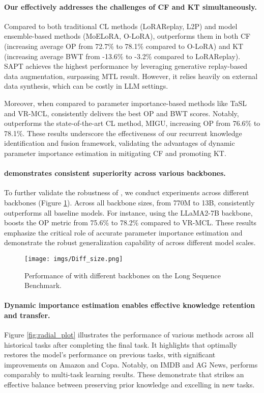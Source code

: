 \paragraph{Our {\ouralg} effectively addresses the challenges of CF and KT simultaneously.}
Compared to both traditional CL methods (LoRAReplay, L2P) and model ensemble-based methods (MoELoRA, O-LoRA), {\ouralg} outperforms them in both CF (increasing average OP from 72.7\% to 78.1\% compared to O-LoRA) and KT (increasing average BWT from -13.6\% to -3.2\% compared to LoRAReplay).
SAPT achieves the highest performance by leveraging generative replay-based data augmentation, surpassing MTL result. However, it relies heavily on external data synthesis, which can be costly in LLM settings.

Moreover, when compared to parameter importance-based methods like TaSL and VR-MCL, {\ouralg} consistently delivers the best OP and BWT scores. 
Notably, {\ouralg} outperforms the state-of-the-art CL method, MIGU, increasing OP from 76.6\% to 78.1\%.
These results underscore the effectiveness of our recurrent knowledge identification and fusion framework, validating the advantages of dynamic parameter importance estimation in mitigating CF and promoting KT.


\paragraph{{\ouralg} demonstrates consistent superiority across various backbones.}
To further validate the robustness of {\ouralg}, we conduct experiments across different backbones (Figure \ref{fig:different_size}). Across all backbone sizes, from 770M to 13B, {\ouralg} consistently outperforms all baseline models.
For instance, using the LLaMA2-7B backbone, {\ouralg} boosts the OP metric from 75.6\% to 78.2\% compared to VR-MCL. 
These results emphasize the critical role of accurate parameter importance estimation and demonstrate the robust generalization capability of {\ouralg} across different model scales.

\begin{figure}[t]
  \centering
  \texttt{[image: imgs/Diff\_size.png]}
  \caption{Performance of {\ouralg} with different backbones on the Long Sequence Benchmark.}
  \label{fig:different_size}
\end{figure}


\paragraph{Dynamic importance estimation enables effective knowledge retention and transfer.}
Figure \ref{fig:radial_plot} illustrates the performance of various methods across all historical tasks after completing the final task.
It highlights that {\ouralg} optimally restores the model’s performance on previous tasks, with significant improvements on Amazon and Copa.
Notably, on IMDB and AG News, {\ouralg} performs comparably to multi-task learning results. These demonstrate that {\ouralg} strikes an effective balance between preserving prior knowledge and excelling in new tasks.

